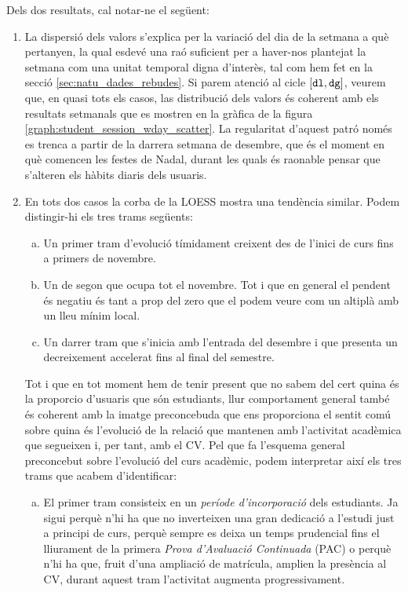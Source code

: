 \documentclass[
	a4paper,
	twoside,
	justified
]{tufte-book}
\begin{document}
Dels dos resultats, cal notar-ne el següent:

\begin{enumerate}[(1)]

\item La dispersió dels valors s'explica per la variació del dia de la setmana a què pertanyen, la qual esdevé una raó suficient per a haver-nos plantejat la setmana com una unitat temporal digna d'interès, tal com hem fet en la secció \ref{sec:natu_dades_rebudes}. Si parem atenció al cicle $[\texttt{dl}, \texttt{dg}]$, veurem que, en quasi tots els casos, las distribució dels valors és coherent amb els resultats setmanals que es mostren en la gràfica de la figura \ref{graph:student_session_wday_scatter}. La regularitat d'aquest patró només es trenca a partir de la darrera setmana de desembre, que és el moment en què comencen les festes de Nadal, durant les quals és raonable pensar que s'alteren els hàbits diaris dels usuaris. 

\item En tots dos casos la corba de la LOESS mostra una tendència similar. Podem distingir-hi els tres trams següents:

	\begin{enumerate}[(a)]
	\item Un primer tram d'evolució tímidament creixent des de l'inici de curs fins a primers de novembre.
	\item Un de segon que ocupa tot el novembre. Tot i que en general el pendent és negatiu és tant a prop del zero que el podem veure com un altiplà amb un lleu mínim local.
	\item Un darrer tram que s'inicia amb l'entrada del desembre i que presenta un decreixement accelerat fins al final del semestre.  
	\end{enumerate}

Tot i que en tot moment hem de tenir present que no sabem del cert quina és la proporcio d'usuaris que són estudiants, llur comportament general també és coherent amb la imatge preconcebuda que ens proporciona el sentit comú sobre quina és l'evolució de la relació que mantenen amb l'activitat acadèmica que segueixen i, per tant, amb el CV. Pel que fa l'esquema general preconcebut sobre l'evolució del curs acadèmic, podem interpretar així els tres trams que acabem d'identificar:

	\begin{enumerate}[(a)]
	\item El primer tram consisteix en un \emph{període d'incorporació} dels estudiants. Ja sigui perquè n'hi ha que no inverteixen una gran dedicació a l'estudi just a principi de curs, perquè sempre es deixa un temps prudencial fins el lliurament de la primera \emph{Prova d'Avaluació Continuada} (PAC) o perquè n'hi ha que, fruit d'una ampliació de matrícula, amplien la presència al CV, durant aquest tram l'activitat augmenta progressivament. 
	  

\end{enumerate}
\end{enumerate}
\end{document}
